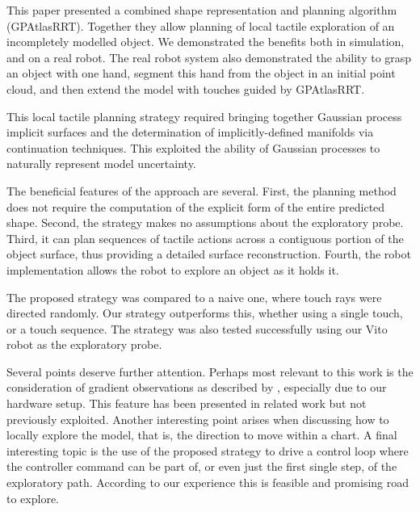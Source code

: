 This paper presented a combined shape representation and planning algorithm (GPAtlasRRT). Together they allow planning of local tactile exploration of an incompletely modelled object. We demonstrated the benefits both in simulation, and on a real robot. The real robot system also demonstrated the ability to grasp an object with one hand, segment this hand from the object in an initial point cloud, and then extend the model with touches guided by GPAtlasRRT.

This local tactile planning strategy required bringing together Gaussian process implicit surfaces and the determination of implicitly-defined manifolds via continuation techniques. This exploited the ability of Gaussian processes to naturally represent model uncertainty. 

The beneficial features of the approach are several. First, the planning method does not require the computation of the explicit form of the entire predicted shape. Second, the strategy makes no assumptions about the exploratory probe. Third, it can plan sequences of tactile actions across a contiguous portion of the object surface, thus providing a detailed surface reconstruction. Fourth, the robot implementation allows the robot to explore an object as it holds it.

The proposed strategy was compared to a naive one, where touch rays were directed randomly. Our strategy outperforms this, whether using a single touch, or a touch sequence. The strategy was also tested successfully using our Vito robot as the exploratory probe.

Several points deserve further attention. Perhaps most relevant to this work is the consideration of gradient observations as described by \cite{Solak2003Derivative}, especially due to our hardware setup. This feature has been presented in related work but not previously exploited. Another interesting point arises when discussing how to locally explore the model, that is, the direction to move within a chart. 
A final interesting topic is the use of the proposed strategy to drive a control loop where the controller command can be part of, or even just the first single step, of the exploratory path. According to our experience this is feasible and promising road to explore.
